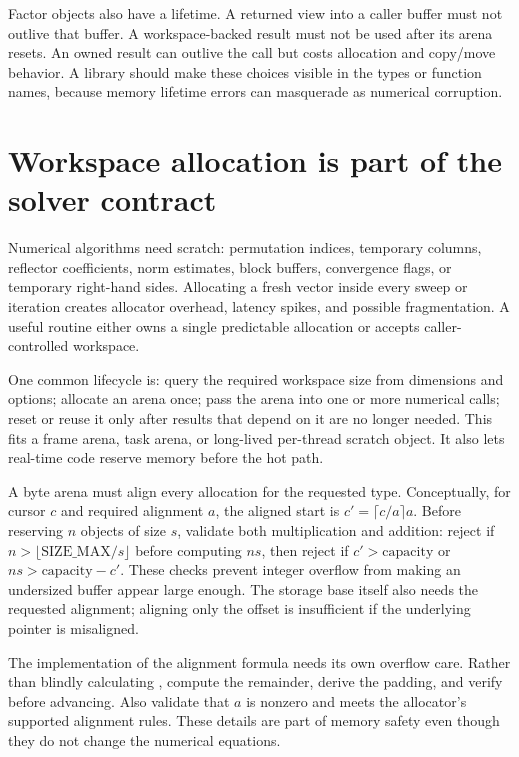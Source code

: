 Factor objects also have a lifetime. A returned view into a caller buffer must not outlive that buffer. A workspace-backed result must not be used after its arena resets. An owned result can outlive the call but costs allocation and copy/move behavior. A library should make these choices visible in the types or function names, because memory lifetime errors can masquerade as numerical corruption.

\section{Workspace allocation is part of the solver contract}\label{02-foundations-ii-ch038-workspace-allocation-is-part-of-the-solver-contract}

\hypertarget{02-foundations-ii-ch038-workspace-allocation-is-part-of-the-solver-contract}{}

Numerical algorithms need scratch: permutation indices, temporary columns, reflector coefficients, norm estimates, block buffers, convergence flags, or temporary right-hand sides. Allocating a fresh vector inside every sweep or iteration creates allocator overhead, latency spikes, and possible fragmentation. A useful routine either owns a single predictable allocation or accepts caller-controlled workspace.

One common lifecycle is: query the required workspace size from dimensions and options; allocate an arena once; pass the arena into one or more numerical calls; reset or reuse it only after results that depend on it are no longer needed. This fits a frame arena, task arena, or long-lived per-thread scratch object. It also lets real-time code reserve memory before the hot path.

A byte arena must align every allocation for the requested type. Conceptually, for cursor \(c\) and required alignment \(a\), the aligned start is \(c'=\lceil c/a\rceil a\). Before reserving \(n\) objects of size \(s\), validate both multiplication and addition: reject if \(n>\lfloor\text{SIZE\_MAX}/s\rfloor\) before computing \(ns\), then reject if \(c'>\text{capacity}\) or \(ns>\text{capacity}-c'\). These checks prevent integer overflow from making an undersized buffer appear large enough. The storage base itself also needs the requested alignment; aligning only the offset is insufficient if the underlying pointer is misaligned.

The implementation of the alignment formula needs its own overflow care. Rather than blindly calculating , compute the remainder, derive the padding, and verify  before advancing. Also validate that \(a\) is nonzero and meets the allocator's supported alignment rules. These details are part of memory safety even though they do not change the numerical equations.

